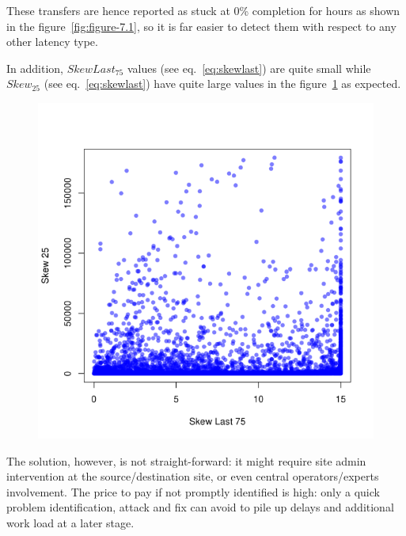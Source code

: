 These transfers are hence reported as stuck at 0\% completion for
hours as shown in the figure~\ref{fig:figure-7.1}, so it is far easier
to detect them with respect to any other latency type.



In addition, $SkewLast_{75}$ values (see eq.~\ref{eq:skewlast}) are quite small while $Skew_{25}$ (see eq.~\ref{eq:skewlast}) have quite large values in the figure~\ref{fig:figure-7.2} as expected.

\begin{figure}[htp]
\centering
\includegraphics{Figures/figure-72.pdf}
\caption{}\label{fig:figure-7.2}
\end{figure}

The solution, however, is not straight-forward: it might require site
admin intervention at the source/destination site, or even central
operators/experts involvement. The price to pay if not promptly
identified is high: only a quick problem identification, attack and
fix can avoid to pile up delays and additional work load at a later
stage.
